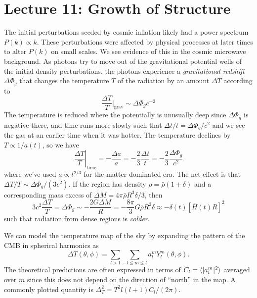 \documentclass[]{article}
\begin{document}
\section{Lecture 11: Growth of Structure}

The initial perturbations seeded by cosmic inflation likely had a
power spectrum $P(k) \propto k$.  These perturbations were affected
by physical processes at later times to alter $P(k)$ on small scales.
We see evidence of this in the cosmic microwave background. As
photons try to move out of the gravitational potential wells of the
initial density perturbations, the photons experience a 
{\it gravitational redshift} $\Delta\Phi_g$ that changes the
temperature $T$ of the radiation by an amount $\Delta T$ according
to
\begin{equation}
\frac{\Delta T}{T}|_{\mathrm{grav}} \sim \Delta \Phi_g c^{-2}
\end{equation}
\noindent
The temperature is reduced where the potentially
is unusually deep since $\Delta \Phi_g$ is negative
there, and time runs more slowly such that $\Delta t/t =\Delta \Phi_g/c^2$
and we see the gas at an earlier time when it was hotter.  The temperature
declines by $T\propto 1/ a(t)$, so we have
\begin{equation}
\left.\frac{\Delta T}{T}\right|_{\mathrm{time}} = -\frac{\Delta a}{a} = -\frac{2}{3}\frac{\Delta t}{t} =  -\frac{2}{3}\frac{\Delta \Phi_g}{c^2}
\end{equation}
\noindent
where we've used $a\propto t^{2/3}$ for the matter-dominated era.
The net effect is that $\Delta T/T \sim \Delta \Phi_g / (3 c^2)$.
If the region has density $\rho = \bar{\rho}(1+\delta)$ and a
corresponding mass excess of $\Delta M = 4\pi \bar{\rho}R^3 \delta / 3$,
then 
\begin{equation}
3c^2\frac{\Delta T}{T} = \Delta \Phi_g \sim - \frac{2G\Delta M}{R} = - \frac{8\pi}{3} G \bar{\rho}R^2 \delta \approx - \delta(t)[\bar{H}(t)R]^2
\end{equation}
\noindent
such that radiation from dense regions is {\it colder}.

We can model the temperature map of the sky by expanding
the pattern of the CMB in spherical harmonics as
\begin{equation}
\Delta T(\theta, \phi) = \sum_{l>1} \sum_{-l\le m \le l} a_l^m Y_l^m(\theta, \phi).
\end{equation}
\noindent
The theoretical predictions are often expressed in terms of $C_l = \langle|a_l^m|^2\rangle$ averaged over $m$ since this does not depend on the direction of ``north''
in the map.  A commonly plotted quantity is $\Delta_T^2 = T^2 l(l+1)C_l/(2\pi)$.
\end{document}
